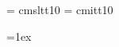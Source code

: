 %
%



%

%
%
\font\tenttsl = cmsltt10     %
\font\tenttit = cmitt10      %
\let\IdentifierFont  = \it
\let\IdentifierColor = \Black
\let\TextFont  = \sl
\let\TextColor = \Black
\let\KeywordFont  = \bf
\let\KeywordColor = \Black
\let\CommentFont  = \tenttit
\let\CommentColor = \Black
\let\DirectiveFont  = \tenttsl
\let\DirectiveColor = \Black
\let\SymbolFont  = \tt
\let\SymbolColor = \Black
\let\SpecialFont  = \tt     %
\let\SpecialColor = \Black  %

%
%
\newdimen\SpaceSkip          %
\SpaceSkip=1ex


